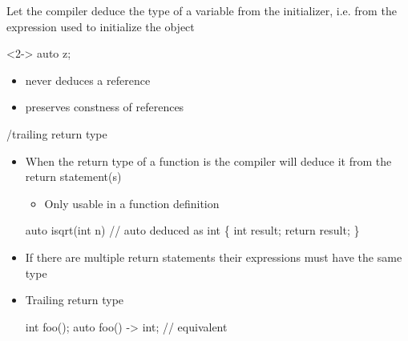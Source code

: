 \begin{frame}[fragile]{}

  Let the compiler deduce the type of a variable from the initializer, i.e. from
  the expression used to initialize the object

  \begin{codeblock}<2->{
auto z;                       }\end{codeblock}

  \begin{itemize}
  \item<10->  never deduces a reference
  \item<11->  preserves constness of references
  \end{itemize}
\end{frame}

\begin{frame}[fragile]{/trailing return type}

  \begin{itemize}
  \item When the return type of a function is  the compiler will
    deduce it from the return statement(s)
    \begin{itemize}
    \item Only usable in a function definition
    \end{itemize}

    \begin{codeblock}
auto isqrt(int n)    // auto deduced as int
\{
  int result;
  \ddd
  return result;
\}
\end{codeblock}

  \item<2-> If there are multiple return statements their expressions must have the
    same type
  \item<3-> Trailing return type
    \begin{codeblock}
int foo(\ddd);
auto foo(\ddd) -> int; // equivalent\end{codeblock}

  \end{itemize}

\end{frame}

